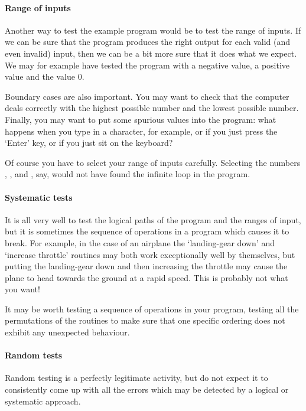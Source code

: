 \paragraph{Range of inputs} Another way to test the example program
would be to test the range of  
inputs. If we can be sure that the program produces the right output for
each valid (and even invalid) input, then we can be a bit more sure that it
does what we expect. We may for example have tested the program with a 
negative value, a positive value and the value 0.

\noindent
Boundary cases are also important. You may want to check that the computer
deals correctly with the highest possible number and the lowest possible 
number. Finally, you may want to put some spurious values into the program:
what happens when you type in a character, for example, or if you just press 
the `Enter' key, or if you just sit on the keyboard?

\noindent
Of course you have to select your range of inputs carefully. Selecting the 
numbers ,  
,  and , say, 
would not have found the infinite loop in the program.

\paragraph{Systematic tests} It is all very well to test the logical
paths of the program and 
the ranges of input, but it is sometimes the sequence of operations in
a program which causes it to break. For example, in the case of an
airplane the `landing-gear down' and
`increase throttle' routines may both work exceptionally well by themselves, 
but putting the landing-gear down and then increasing the throttle may cause
the plane to head towards the ground at a rapid speed. This is probably not
what you want!


It may be worth testing a sequence of operations in your program, testing
all the permutations of the routines 
to make sure that one specific ordering does not exhibit any
unexpected behaviour.  

\paragraph{Random tests} Random testing is a perfectly legitimate
activity, but do not expect it to consistently come up with all the
errors which may be detected by a logical or systematic approach.

